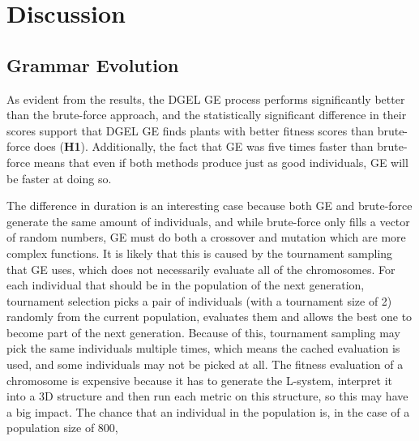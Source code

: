 \chapter{Discussion}
\section{Grammar Evolution}
As evident from the results, the \gls{DGEL} \gls{GE} process performs significantly better than the brute-force approach, and the statistically significant difference in their scores support that \gls{DGEL} \gls{GE} finds plants with better fitness scores than brute-force does (\textbf{H1}).
Additionally, the fact that \gls{GE} was five times faster than brute-force means that even if both methods produce just as good individuals, \gls{GE} will be faster at doing so.

The difference in duration is an interesting case because both \gls{GE} and brute-force generate the same amount of individuals, and while brute-force only fills a vector of random numbers, \gls{GE} must do both a crossover and mutation which are more complex functions.
It is likely that this is caused by the tournament sampling that \gls{GE} uses, which does not necessarily evaluate all of the chromosomes.
For each individual that should be in the population of the next generation, tournament selection picks a pair of individuals (with a tournament size of 2) randomly from the current population, evaluates them and allows the best one to become part of the next generation.
Because of this, tournament sampling may pick the same individuals multiple times, which means the cached evaluation is used, and some individuals may not be picked at all.
The fitness evaluation of a chromosome is expensive because it has to generate the L-system, interpret it into a 3D structure and then run each metric on this structure, so this may have a big impact.
The chance that an individual in the population is, in the case of a population size of 800,

